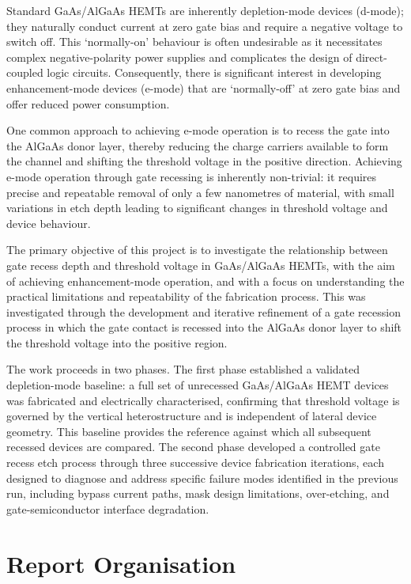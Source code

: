 Standard GaAs/AlGaAs HEMTs are inherently depletion-mode devices (d-mode);
they naturally conduct current at zero gate bias and require a negative
voltage to switch off. \cite{Mimura1980} This `normally-on' behaviour is
often undesirable as it necessitates complex negative-polarity power
supplies \cite{st_d_mode} and complicates the design of direct-coupled
logic circuits. \cite{Xie2011} Consequently, there is significant interest
in developing enhancement-mode devices (e-mode) that are `normally-off' at zero gate bias
and offer reduced power consumption.

One common approach to achieving e-mode operation is to recess the gate
into the AlGaAs donor layer, thereby reducing the charge carriers available
to form the channel and shifting the threshold voltage in the positive
direction. \cite{Saitto2006} Achieving e-mode operation through gate
recessing is inherently non-trivial: it requires precise and repeatable
removal of only a few nanometres of material, with small variations in etch
depth leading to significant changes in threshold voltage and device
behaviour. \cite{Lanford2005}

The primary objective of this project is to investigate the relationship
between gate recess depth and threshold voltage in GaAs/AlGaAs HEMTs, with
the aim of achieving enhancement-mode operation, and with a focus on
understanding the practical limitations and repeatability of the fabrication
process. This was investigated through the development and iterative
refinement of a gate recession process in which the gate contact is recessed
into the AlGaAs donor layer to shift the threshold voltage into the positive
region.

The work proceeds in two phases. The first phase established a validated
depletion-mode baseline: a full set of unrecessed GaAs/AlGaAs HEMT devices
was fabricated and electrically characterised, confirming that threshold
voltage is governed by the vertical heterostructure and is independent of
lateral device geometry. This baseline provides the reference against which
all subsequent recessed devices are compared. The second phase developed a controlled gate recess etch process through
three successive device fabrication iterations, each designed to diagnose
and address specific failure modes identified in the previous run, including
bypass current paths, mask design limitations, over-etching, and
gate-semiconductor interface degradation.

\section*{Report Organisation}
{}

